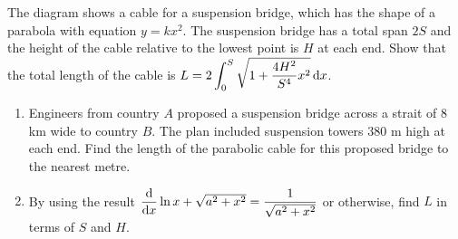 \documentclass{echw}
\begin{document}
    \problem{}
        \begin{center}
        \end{center}

        The diagram shows a cable for a suspension bridge, which has the shape of a parabola with equation $y = kx^2$. The suspension bridge has a total span $2S$ and the height of the cable relative to the lowest point is $H$ at each end. Show that the total length of the cable is $L = 2\displaystyle\int_0^S \sqrt{1 + \dfrac{4H^2}{S^4} x^2} \mathop{\mathrm{d}x}$.

        \begin{enumerate}
            \item Engineers from country $A$ proposed a suspension bridge across a strait of 8 km wide to country $B$. The plan included suspension towers 380 m high at each end. Find the length of the parabolic cable for this proposed bridge to the nearest metre.
            \item By using the result $\dfrac{\mathrm{d} }{\mathrm{d} x} \ln{x + \sqrt{a^2 + x^2}} = \dfrac1{\sqrt{a^2 + x^2}}$ or otherwise, find $L$ in terms of $S$ and $H$.
        \end{enumerate}
\end{document}
